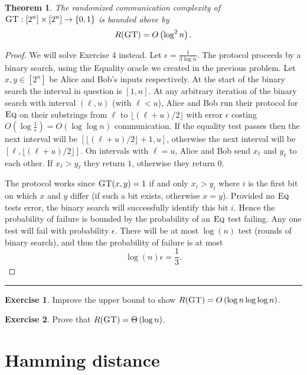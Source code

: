 \documentclass[11pt]{amsart}
\theoremstyle{plain}
\newtheorem{theorem}{Theorem}
\theoremstyle{definition}
\newtheorem{exercise}{Exercise}
\theoremstyle{plain}
\newcommand{\Eq}{\textsc{Eq}}
\newcommand{\GT}{\textsc{GT}}
\newcommand{\exercises}{\bigskip \noindent\rule{8cm}{0.4pt} \medskip}
\begin{document}
\begin{theorem}
The randomized communication complexity of $\GT : [2^n] \times [2^n] \to \{0,1\}$ is bounded above by
\[
R(\GT) = O\left(\log^2 n \right).
\]
\end{theorem}

\begin{proof}
We will solve Exercise $4$ instead. Let $\epsilon = \frac{1}{3\log n}$. The protocol proceeds by a binary search, using the Equality oracle we created in the previous problem. Let $x, y \in [2^n]$ be Alice and Bob's inputs respectively. At the start of the binary search the interval in question is $[1,n]$. At any arbitrary iteration of the binary search with interval $(\ell, u)$ (with $\ell < u$), Alice and Bob run their protocol for $\Eq$ on their substrings from $\ell$ to $\lfloor (\ell+u)/2 \rfloor$ with error $\epsilon$ costing $O(\log \frac{1}{\epsilon}) = O(\log\log n)$ communication. If the equality test passes then the next interval will be $[\lfloor (\ell+u)/2 \rfloor + 1, u]$, otherwise the next interval will be $[\ell, \lfloor (\ell+u)/2 \rfloor]$. On intervals with $\ell = u$, Alice and Bob send $x_\ell$ and $y_\ell$ to each other. If $x_\ell > y_\ell$ they return $1$, otherwise they return $0$.

The protocol works since $\GT(x,y) = 1$ if and only $x_i > y_i$ where $i$ is the first bit on which $x$ and $y$ differ (if such a bit exists, otherwise $x=y$). Provided no $\Eq$ tests error, the binary search will successfully identify this bit $i$. Hence the probability of failure is bounded by the probability of an $\Eq$ test failing. Any one test will fail with probability $\epsilon$. There will be at most $\log(n)$ test (rounds of binary search), and thus the probability of failure is at most
$$\log(n) \epsilon = \frac{1}{3}.$$
\end{proof}

\exercises

\begin{exercise}
Improve the upper bound to show $R(\GT) = O\left(\log n \log \log n \right)$.
\end{exercise}

\begin{exercise}
Prove that $R(\GT) = \Theta\left(\log n \right)$.
\end{exercise}


\newpage 
\section{Hamming distance}
\end{document}
